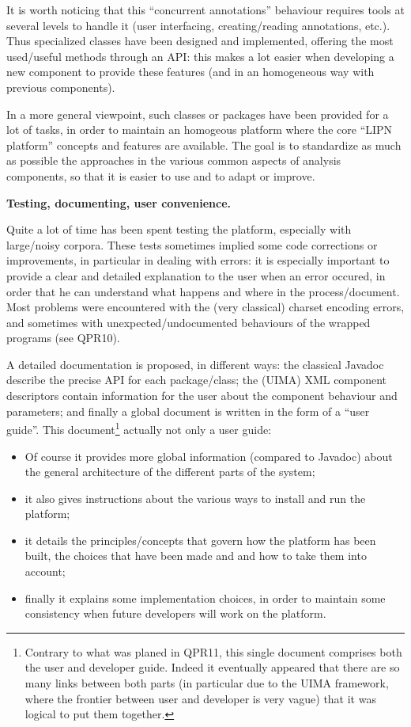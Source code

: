 It is worth noticing that this ``concurrent annotations'' behaviour requires tools at several levels to handle it (user interfacing, creating/reading annotations, etc.). Thus specialized classes have been designed and implemented, offering the most used/useful methods through an API: this makes a lot easier when developing a new component to provide these features (and in an homogeneous way with previous components). 

In a more general viewpoint, such classes or packages have been provided for a lot of tasks, in order to maintain an homogeous platform where the core ``LIPN platform'' concepts and features are available. The goal is to standardize as much as possible the approaches in the various common aspects of analysis components, so that it is easier to use and to adapt or improve.

{\bf Testing, documenting, user convenience.} 

Quite a lot of time has been spent testing the platform, especially with large/noisy corpora. These tests sometimes implied some code corrections or improvements, in particular in dealing with errors: it is especially important to provide a clear and detailed explanation to the user when an error occured, in order that he can understand what happens and where in the process/document. Most problems were encountered with the (very classical) charset encoding errors, and sometimes with unexpected/undocumented behaviours of the wrapped programs (see QPR10).

A detailed documentation is proposed, in different ways: the classical Javadoc describe the precise API for each package/class; the (UIMA) XML component descriptors contain information for the user about the component behaviour and parameters; and finally a global document is written in the form of a ``user guide''. This document\footnote{Contrary to what was planed in QPR11, this single document comprises both the user and developer guide. Indeed it eventually appeared that there are so many links between both parts (in particular due to the UIMA framework, where the frontier between user and developer is very vague) that it was logical to put them together.} actually not only a user guide: 

\begin{itemize}
\item Of course it provides more global information (compared to Javadoc) about the general architecture of the different parts of the system;
\item it also gives instructions about the various ways to install and run the platform;
\item it details the principles/concepts that govern how the platform has been built, the choices that have been made and and how to take them into account;
\item finally it explains some implementation choices, in order to maintain some consistency when future developers will work on the platform.
\end{itemize}


